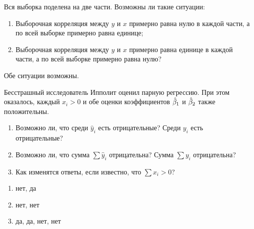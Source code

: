 \begin{problem}
Вся выборка поделена на две части. Возможны ли такие ситуации:
\begin{enumerate}
    \item Выборочная корреляция между $y$ и $x$ примерно равна нулю в каждой части,
    а по всей выборке примерно равна единице;
    \item Выборочная корреляция между $y$ и $x$ примерно равна единице в каждой части,
    а по всей выборке примерно равна нулю?
\end{enumerate}

\begin{sol}
Обе ситуации возможны.
\end{sol}
\end{problem}


\begin{problem}
Бесстрашный исследователь Ипполит оценил парную регрессию. При этом оказалось,
каждый $x_i >0$ и обе оценки коэффициентов $\hat{\beta}_1$ и $\hat{\beta}_2$ также положительны.

\begin{enumerate}
  \item Возможно ли, что среди $\hat y_i$ есть отрицательные? Среди $y_i$ есть отрицательные?
  \item Возможно ли, что сумма $\sum \hat y_i$ отрицательна? Сумма $\sum y_i$ отрицательна?
  \item Как изменятся ответы, если известно, что $\sum x_i >0$?
\end{enumerate}

\begin{sol}
  \begin{enumerate}
    \item нет, да
    \item нет, нет
    \item да, да, нет, нет
  \end{enumerate}
\end{sol}
\end{problem}



